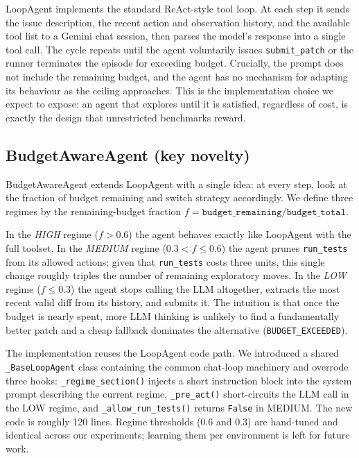 \documentclass[11pt]{article}
\begin{document}
LoopAgent implements the standard ReAct-style tool loop. At each step
it sends the issue description, the recent action and observation
history, and the available tool list to a Gemini chat session, then
parses the model's response into a single tool call. The cycle repeats
until the agent voluntarily issues \texttt{submit\_patch} or the runner
terminates the episode for exceeding budget. Crucially, the prompt does
not include the remaining budget, and the agent has no mechanism for
adapting its behaviour as the ceiling approaches. This is the
implementation choice we expect to expose: an agent that explores until
it is satisfied, regardless of cost, is exactly the design that
unrestricted benchmarks reward.

\subsection{BudgetAwareAgent (key novelty)}
\label{sec:agents:budgetaware}

BudgetAwareAgent extends LoopAgent with a single idea: at every step,
look at the fraction of budget remaining and switch strategy
accordingly. We define three regimes by the remaining-budget fraction
$f = \texttt{budget\_remaining} / \texttt{budget\_total}$.

In the \emph{HIGH} regime ($f > 0.6$) the agent behaves exactly like
LoopAgent with the full toolset. In the \emph{MEDIUM} regime
($0.3 < f \le 0.6$) the agent prunes \texttt{run\_tests} from its
allowed actions; given that \texttt{run\_tests} costs three units, this
single change roughly triples the number of remaining exploratory
moves. In the \emph{LOW} regime ($f \le 0.3$) the agent stops calling
the LLM altogether, extracts the most recent valid diff from its
history, and submits it. The intuition is that once the budget is
nearly spent, more LLM thinking is unlikely to find a fundamentally
better patch and a cheap fallback dominates the alternative
(\texttt{BUDGET\_EXCEEDED}).

The implementation reuses the LoopAgent code path. We introduced a
shared \texttt{\_BaseLoopAgent} class containing the common chat-loop
machinery and overrode three hooks: \texttt{\_regime\_section()}
injects a short instruction block into the system prompt describing
the current regime, \texttt{\_pre\_act()} short-circuits the LLM call
in the LOW regime, and \texttt{\_allow\_run\_tests()} returns
\texttt{False} in MEDIUM. The new code is roughly 120 lines. Regime
thresholds (0.6 and 0.3) are hand-tuned and identical across our
experiments; learning them per environment is left for future
work.
\end{document}
